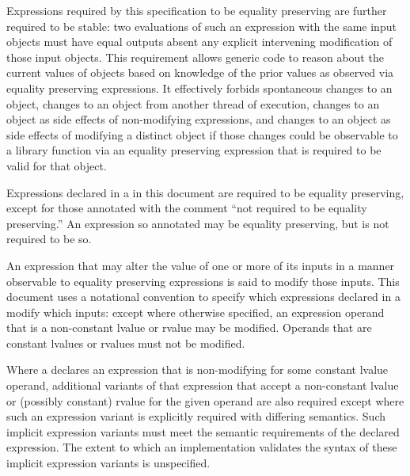 \begin{addedblock}
\pnum
Expressions required by this specification to be equality preserving are
further required to be stable: two evaluations of such an expression with the same
input objects must have equal outputs absent any
explicit intervening modification of those input objects.
\enternote This requirement allows generic code to reason
about the current values of objects based on knowledge of the prior values as
observed via equality preserving expressions. It effectively forbids spontaneous
changes to an object, changes to an object from another thread of execution, changes
to an object as side effects of non-modifying expressions, and changes to an object as
side effects of modifying a distinct object if those changes could be observable
to a library function via an equality preserving expression that is required to be
valid for that object. \exitnote

\pnum
Expressions declared in a  in this document are
required to be equality preserving, except for those annotated with the comment
``not required to be equality preserving.'' An expression so annotated
may be equality preserving, but is not required to be so.

\pnum
An expression that may alter the value of one or more of its inputs in a manner
observable to equality preserving expressions is said to modify those inputs.
This document uses a notational convention to specify which expressions declared
in a  modify which inputs: except where otherwise
specified, an expression operand that is a non-constant lvalue or rvalue may be
modified. Operands that are constant lvalues or rvalues must not be modified.

\pnum
Where a  declares an expression that is non-modifying
for some constant lvalue operand, additional variants of that expression that accept
a non-constant lvalue or (possibly constant) rvalue for the given operand are also
required except where such an expression variant is explicitly required with
differing semantics. Such implicit expression variants must meet the semantic
requirements of the declared expression. The extent to which an implementation
validates the syntax of these implicit expression variants is unspecified.



\end{addedblock}
